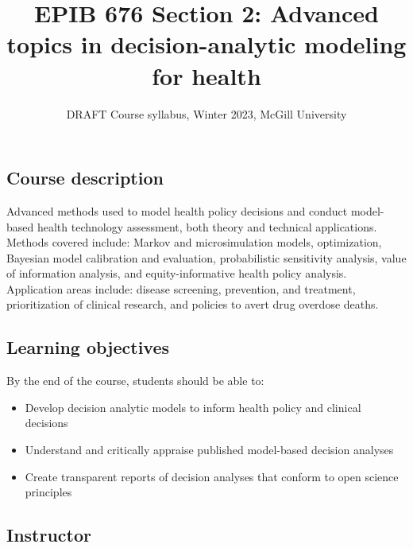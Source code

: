 \documentclass[
  letterpaper,
  DIV=11,
  numbers=noendperiod]{scrartcl}
\title{EPIB 676 Section 2: Advanced topics in decision-analytic modeling
for health}
\subtitle{DRAFT Course syllabus, Winter 2023, McGill University}
\author{}
\date{}
\providecommand{\tightlist}{%
  \setlength{\itemsep}{0pt}\setlength{\parskip}{0pt}}\usepackage{longtable,booktabs,array}
\renewcommand*\contentsname{Table of contents}
\newcommand\contentsname{Table of contents}
\begin{document}
\maketitle
\ifdefined\Shaded\renewenvironment{Shaded}{\begin{tcolorbox}[breakable, enhanced, interior hidden, borderline west={3pt}{0pt}{shadecolor}, frame hidden, sharp corners, boxrule=0pt]}{\end{tcolorbox}}\fi

\renewcommand*\contentsname{Table of contents}
{
\hypersetup{linkcolor=}
\setcounter{tocdepth}{3}
\tableofcontents
}
\hypertarget{course-description}{%
\subsection{Course description}\label{course-description}}

Advanced methods used to model health policy decisions and conduct
model-based health technology assessment, both theory and technical
applications. Methods covered include: Markov and microsimulation
models, optimization, Bayesian model calibration and evaluation,
probabilistic sensitivity analysis, value of information analysis, and
equity-informative health policy analysis. Application areas include:
disease screening, prevention, and treatment, prioritization of clinical
research, and policies to avert drug overdose deaths.

\hypertarget{learning-objectives}{%
\subsection{Learning objectives}\label{learning-objectives}}

By the end of the course, students should be able to:

\begin{itemize}
\tightlist
\item
  Develop decision analytic models to inform health policy and clinical
  decisions
\item
  Understand and critically appraise published model-based decision
  analyses
\item
  Create transparent reports of decision analyses that conform to open
  science principles
\end{itemize}

\hypertarget{instructor}{%
\subsection{Instructor}\label{instructor}}
\end{document}
